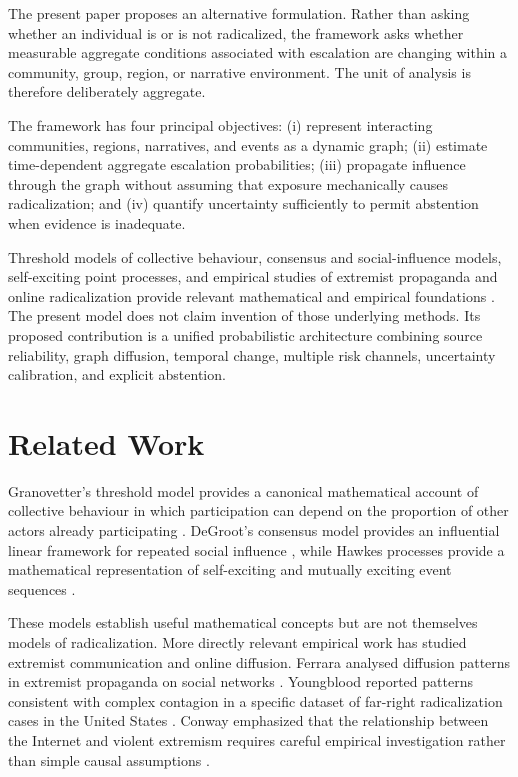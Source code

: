 \documentclass[11pt,letterpaper]{article}
\begin{document}
The present paper proposes an alternative formulation. Rather than asking whether an individual is or is not radicalized, the framework asks whether measurable aggregate conditions associated with escalation are changing within a community, group, region, or narrative environment. The unit of analysis is therefore deliberately aggregate.

The framework has four principal objectives: (i) represent interacting communities, regions, narratives, and events as a dynamic graph; (ii) estimate time-dependent aggregate escalation probabilities; (iii) propagate influence through the graph without assuming that exposure mechanically causes radicalization; and (iv) quantify uncertainty sufficiently to permit abstention when evidence is inadequate.

Threshold models of collective behaviour, consensus and social-influence models, self-exciting point processes, and empirical studies of extremist propaganda and online radicalization provide relevant mathematical and empirical foundations \citep{granovetter1978,degroot1974,hawkes1971,ferrara2017,conway2017,youngblood2020}. The present model does not claim invention of those underlying methods. Its proposed contribution is a unified probabilistic architecture combining source reliability, graph diffusion, temporal change, multiple risk channels, uncertainty calibration, and explicit abstention.

\section{Related Work}
Granovetter's threshold model provides a canonical mathematical account of collective behaviour in which participation can depend on the proportion of other actors already participating \citep{granovetter1978}. DeGroot's consensus model provides an influential linear framework for repeated social influence \citep{degroot1974}, while Hawkes processes provide a mathematical representation of self-exciting and mutually exciting event sequences \citep{hawkes1971}.

These models establish useful mathematical concepts but are not themselves models of radicalization. More directly relevant empirical work has studied extremist communication and online diffusion. Ferrara analysed diffusion patterns in extremist propaganda on social networks \citep{ferrara2017}. Youngblood reported patterns consistent with complex contagion in a specific dataset of far-right radicalization cases in the United States \citep{youngblood2020}. Conway emphasized that the relationship between the Internet and violent extremism requires careful empirical investigation rather than simple causal assumptions \citep{conway2017}.
\end{document}
